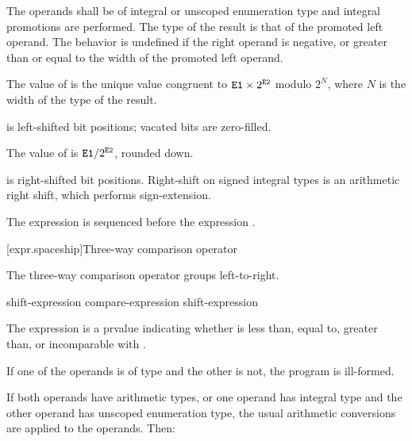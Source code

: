 The operands shall be of integral or unscoped enumeration type and integral
promotions are performed. The type of the result is that of the promoted
left operand.
%
The behavior is undefined if the right operand is negative, or greater
than or equal to the width of the promoted left operand.

\pnum
The value of  is the unique value congruent to
$\texttt{E1} \times 2^{\texttt{E2}}$ modulo $2^N$,
where $N$ is the width of the type of the result.
\begin{note}
 is left-shifted  bit positions;
vacated bits are zero-filled.
\end{note}

\pnum
The value of  is $\texttt{E1} / 2^{\texttt{E2}}$, rounded down.
\begin{note}
 is right-shifted  bit positions.
Right-shift on signed integral types is an arithmetic right shift,
which performs sign-extension.
\end{note}

\pnum
The expression  is sequenced before the expression .

[expr.spaceship]{Three-way comparison operator}
%
%

\pnum
The three-way comparison operator groups left-to-right.

%
%
%

\begin{bnf}
\br
    shift-expression\br
    compare-expression \terminal{<=>} shift-expression
\end{bnf}

\pnum
The expression  is a prvalue indicating whether
 is less than, equal to, greater than, or incomparable with
.

\pnum
If one of the operands is of type 
and the other is not, the program is ill-formed.

\pnum
If both operands have arithmetic types,
or one operand has integral type and
the other operand has unscoped enumeration type,
the usual arithmetic conversions are applied to the operands.
Then:

